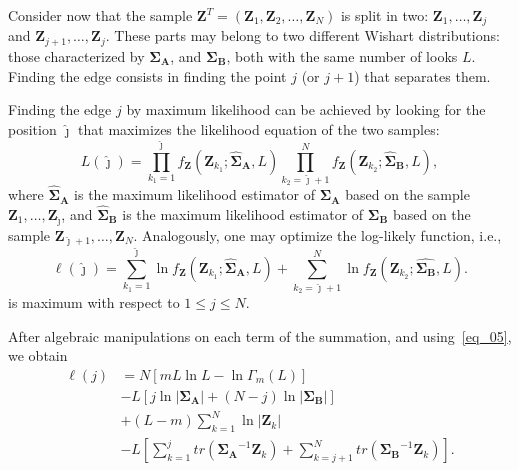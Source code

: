 \documentclass[conference]{IEEEtran}
\begin{document}
Consider now that the sample $\mathbf{Z}^T=(\mathbf{Z}_1,\mathbf{Z}_2,\dots,\mathbf{Z}_N)$ is split in two: $\mathbf{Z}_1,\dots,\mathbf{Z}_j$ and $\mathbf{Z}_{j+1},\dots,\mathbf{Z}_j$.
These parts may belong to two different Wishart distributions: those characterized by  $\mathbf{\Sigma_A}$, and $\mathbf{\Sigma_B}$, both with the same number of looks $L$.
Finding the edge consists in finding the point $j$ (or $j+1$) that separates them.


Finding the edge $j$ by maximum likelihood can be achieved by looking for the position $\widehat\jmath$ that maximizes the likelihood equation of the two samples:
%
\begin{equation}\label{eq_10}
	L(\widehat\jmath)=\prod_{k_1=1}^{\widehat\jmath}f_{\mathbf{Z}}(\mathbf{Z}_{k_1};\mathbf{\widehat\Sigma_{A}},L) \prod_{k_2=\widehat\jmath+1}^{N}f_{\mathbf{Z}}(\mathbf{Z}_{k_2};\mathbf{\widehat\Sigma_{B}},L),
\end{equation}
where $\mathbf{\widehat\Sigma_{A}}$ is the maximum likelihood estimator of $\mathbf{\Sigma_{A}}$ based on the sample $\mathbf{Z}_1,\dots,\mathbf{Z}_{\widehat\jmath}$, 
and $\mathbf{\widehat\Sigma_{B}}$ is the maximum likelihood estimator of $\mathbf{\Sigma_{B}}$ based on the sample $\mathbf{Z}_{\widehat\jmath+1},\dots,\mathbf{Z}_{N}$.
Analogously, one may optimize the log-likely function, i.e.,
\begin{equation}
\ell(\widehat\jmath) =
	\sum_{k_1=1}^{\widehat\jmath}\ln f_{\mathbf{Z}}(\mathbf{Z}_{k_1}; \mathbf{\widehat\Sigma_{A}},L) + \sum_{k_2=\widehat\jmath+1}^{N}\ln f_{\mathbf{Z}}(\mathbf{Z}_{k_2};\widehat{\mathbf{\Sigma_{B}}},L).
	\label{eq_11}
\end{equation}
is maximum with respect to $1\leq j\leq N$.

After algebraic manipulations on each term of the summation, and using~\eqref{eq_05}, we obtain
\begin{align}\label{eq_12}
	\ell(j)&=N\left[mL\ln{L}-\ln{\Gamma_m(L)}\right]\\
	&- L\left[j\ln{|\mathbf{\Sigma_{A}}|}+(N-j)\ln{|\mathbf{\Sigma_{B}}|}\right] \\
	&+(L-m)\sum_{k=1}^{N}\ln{|\mathbf{Z}_{k}|}\\
	&-L\left[\sum_{k=1}^{j}tr(\mathbf{\Sigma_{A}}^{-1}\mathbf{Z}_{k})+ \sum_{k=j+1}^{N}tr(\mathbf{\Sigma_{B}}^{-1}\mathbf{Z}_{k})\right].
\end{align}
\end{document}
